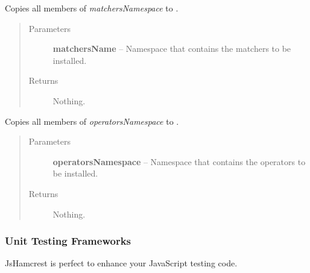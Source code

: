 \documentclass[letterpaper,10pt,english]{sphinxmanual}
\begin{document}
\begin{fulllineitems}
\label{modules/integration:JsHamcrest.Integration.installMatchers}
Copies all members of \emph{matchersNamespace} to {\hyperref[modules/matchers:module-JsHamcrest.Matchers]{}}.
\begin{quote}\begin{description}
\item[{Parameters}] \leavevmode
\textbf{matchersName} -- Namespace that contains the matchers to be installed.

\item[{Returns}] \leavevmode
Nothing.

\end{description}\end{quote}

\end{fulllineitems}


\begin{fulllineitems}
\label{modules/integration:JsHamcrest.Integration.installOperators}
Copies all members of \emph{operatorsNamespace} to {\hyperref[modules/operator:module-JsHamcrest.Operators]{}}.
\begin{quote}\begin{description}
\item[{Parameters}] \leavevmode
\textbf{operatorsNamespace} -- Namespace that contains the operators to be
installed.

\item[{Returns}] \leavevmode
Nothing.

\end{description}\end{quote}

\end{fulllineitems}



\subsubsection{Unit Testing Frameworks}
\label{modules/integration:unit-testing-frameworks}
JsHamcrest is perfect to enhance your JavaScript testing code.
\end{document}
